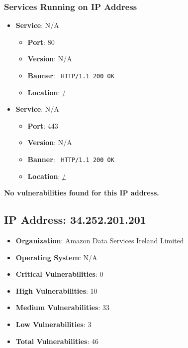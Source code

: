 \documentclass{article}
\begin{document}
\subsubsection*{Services Running on IP Address}

\begin{itemize}
    
        \item \textbf{Service}: N/A
        \begin{itemize}
            \item \textbf{Port}: 80
            \item \textbf{Version}:  N/A 
            \item \textbf{Banner}: \texttt{ HTTP/1.1 200 OK
 }
            \item \textbf{Location}: \href{ / }{ / }
        \end{itemize}
    
        \item \textbf{Service}: N/A
        \begin{itemize}
            \item \textbf{Port}: 443
            \item \textbf{Version}:  N/A 
            \item \textbf{Banner}: \texttt{ HTTP/1.1 200 OK
 }
            \item \textbf{Location}: \href{ / }{ / }
        \end{itemize}
    
\end{itemize}


\textbf{No vulnerabilities found for this IP address.}


\clearpage



\subsection*{IP Address: 34.252.201.201}

\begin{itemize}
    \item \textbf{Organization}: Amazon Data Services Ireland Limited
    \item \textbf{Operating System}:  N/A 
    \item \textbf{Critical Vulnerabilities}: 0
    \item \textbf{High Vulnerabilities}: 10
    \item \textbf{Medium Vulnerabilities}: 33
    \item \textbf{Low Vulnerabilities}: 3
    \item \textbf{Total Vulnerabilities}: 46
\end{itemize}
\end{document}
